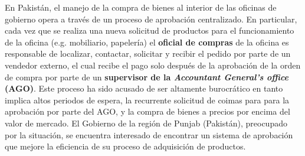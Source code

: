 \documentclass[a4paper, answers, addpoints, 11pt]{exam}
\begin{document}
\bigbreak
En Pakistán, el manejo de la compra de bienes al interior de las oficinas de gobierno opera a través de un proceso de aprobación centralizado. En particular, cada vez que se realiza una nueva solicitud de productos para el funcionamiento de la oficina (e.g. mobiliario, papelería) el \textbf{oficial de compras} de la oficina es responsable de localizar, contactar, solicitar y recibir el pedido por parte de un vendedor externo, el cual recibe el pago solo después de la aprobación de la orden de compra por parte de un \textbf{supervisor de la \textit{Accountant General’s office} (AGO)}. Este proceso ha sido acusado de ser altamente burocrático en tanto implica altos periodos de espera, la recurrente solicitud de coimas para para la aprobación por parte del AGO, y la compra de bienes a precios por encima del valor de mercado. El Gobierno de la región de Punjab (Pakistán), preocupado por la situación, se encuentra interesado de encontrar un sistema de aprobación que mejore la eficiencia de su proceso de adquisición de productos.
\end{document}
